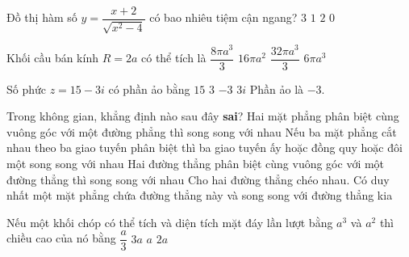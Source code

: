 \begin{ex}%
Đồ thị hàm số $y=\dfrac{x+2}{\sqrt{x^2-4}}$ có bao nhiêu tiệm cận ngang?
\choice
{ $3$}
{$1$}
{\True $2$}
{$0$}
\end{ex}
\begin{ex}%
Khối cầu bán kính  $R=2a$ có thể tích là
\choice
	{$\dfrac{8\pi a^3}{3}$}
	{$16\pi a^2$}
	{\True $\dfrac{32\pi a^3}{3}$}
	{$6\pi a^3$}
\end{ex}
\begin{ex}%
Số phức $z = 15 - 3i$ có phần ảo bằng
 \choice
{$15$} 			
{$3$}			
{\True$ -3$} 		
{$3i$}
\loigiai
{Phần ảo là $-3$.}
\end{ex}

\begin{ex}%
Trong không gian, khẳng định nào sau đây \textbf{sai}?
 \choice
{Hai mặt phẳng phân biệt cùng vuông góc với một đường phẳng thì song song với nhau}
{Nếu ba mặt phẳng cắt nhau theo ba giao tuyến phân biệt thì ba giao tuyến ấy hoặc đồng quy hoặc đôi một song song với nhau} 
{\True Hai đường thẳng phân biệt cùng vuông góc với một đường thẳng thì song song với nhau}
{Cho hai đường thẳng chéo nhau. Có duy nhất một mặt phẳng chứa đường thẳng này và song song với đường thẳng kia}
\end{ex}

\begin{ex}%
Nếu một khối chóp có thể tích và diện tích mặt đáy lần lượt bằng ${a^3}$ và ${a^2}$ thì chiều cao của nó bằng
\choice
	{$\dfrac{a}{3}$}				
	{\True$3a$}			
	{$a$}			
	{$2a$} 
\end{ex}

